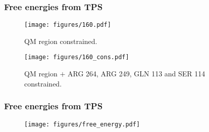 \documentclass[a4paper,8pt]{beamer}
\begin{document}
\begin{frame}
\frametitle{Free energies from TPS}
    \begin{figure}[ht]
        \begin{minipage}[b]{0.45\linewidth}
            \centering
            \texttt{[image: figures/160.pdf]}
            \caption{QM region constrained.}
            \label{fig:a}
        \end{minipage}
        \hspace{0.5cm}
        \begin{minipage}[b]{0.45\linewidth}
            \centering
            \texttt{[image: figures/160\_cons.pdf]}
            \caption{QM region $+$ ARG 264, ARG 249, GLN 113 and SER 114 constrained.}
            \label{fig:b}
        \end{minipage}
    \end{figure}
\end{frame}

\begin{frame}
\frametitle{Free energies from TPS}
\begin{figure}
\texttt{[image: figures/free\_energy.pdf]}
\end{figure}
\end{frame}
%
%
%
\end{document}
